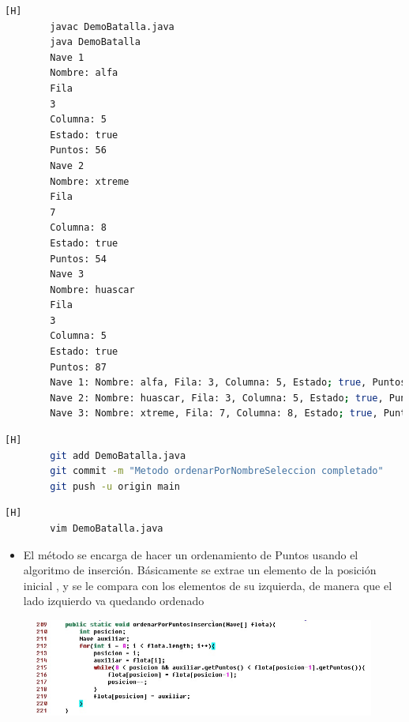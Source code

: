 \documentclass{article}
\begin{document}
	
	\begin{lstlisting}[language=bash,caption={Probando el metodo ordenarPorNombreSeleccion}][H]	
		javac DemoBatalla.java
		java DemoBatalla
		Nave 1
		Nombre: alfa
		Fila
		3
		Columna: 5
		Estado: true
		Puntos: 56
		Nave 2
		Nombre: xtreme
		Fila
		7
		Columna: 8
		Estado: true
		Puntos: 54
		Nave 3
		Nombre: huascar
		Fila
		3
		Columna: 5
		Estado: true
		Puntos: 87
		Nave 1: Nombre: alfa, Fila: 3, Columna: 5, Estado; true, Puntos: 56
		Nave 2: Nombre: huascar, Fila: 3, Columna: 5, Estado; true, Puntos: 87
		Nave 3: Nombre: xtreme, Fila: 7, Columna: 8, Estado; true, Puntos: 54	
	\end{lstlisting}
	\begin{lstlisting}[language=bash,caption={Commit: "Metodo ordenarPorNombreSeleccion completado" }][H]
		git add DemoBatalla.java
		git commit -m "Metodo ordenarPorNombreSeleccion completado"	
		git push -u origin main
	\end{lstlisting}
	
	
	
	
	\begin{lstlisting}[language=bash,caption={Implementado el método ordenarPorPuntosInsercion }][H]
		vim DemoBatalla.java
	\end{lstlisting}
	
	
	\begin{itemize}	
		\item El método se encarga de hacer un ordenamiento de Puntos usando el algoritmo  de inserción. Básicamente se extrae un elemento de la posición inicial , y se le compara con los elementos de su izquierda, de manera que el lado izquierdo va quedando ordenado 
	\end{itemize}	
	
	\begin{figure}[H]
		\centering
		\includegraphics[width=1\textwidth,keepaspectratio]{img/11.jpg}
	\end{figure}
	
\end{document}
